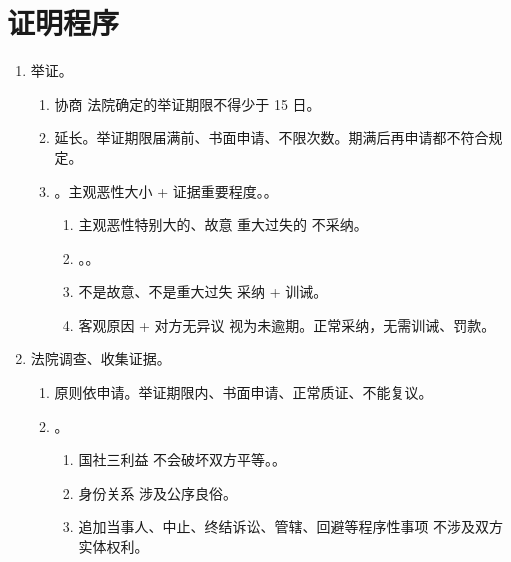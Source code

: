 \section{证明程序}
\begin{enumerate}
  \item 举证。
        \begin{enumerate}
          \item 协商 \hz 法院确定的举证期限不得少于 15 日。
          \item 延长。举证期限届满前、书面申请、不限次数。期满后再申请都不符合规定。
          \item {}。主观恶性大小 + 证据重要程度。。
                \begin{enumerate}
                  \item 主观恶性特别大的、故意 \hz 重大过失的 \yjt 不采纳。
                  \item {}。。
                  \item 不是故意、不是重大过失 \yjt 采纳 + 训诫。
                  \item 客观原因 + 对方无异议 \yjt 视为未逾期。正常采纳，无需训诫、罚款。
                \end{enumerate}
        \end{enumerate}
  \item 法院调查、收集证据。
        \begin{enumerate}
          \item 原则依申请。举证期限内、书面申请、正常质证、不能复议。
          \item {}。
                \begin{enumerate}
                  \item 国社三利益 \yjt 不会破坏双方平等。。
                  \item 身份关系 \yjt 涉及公序良俗。
                  \item 追加当事人、中止、终结诉讼、管辖、回避等程序性事项 \yjt 不涉及双方实体权利。
                \end{enumerate}


\end{enumerate}
\end{enumerate}

